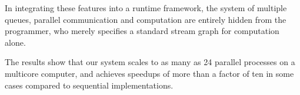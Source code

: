 \documentclass[10pt, conference, compsocconf, reqno]{IEEEtran}
\newcommand{\comment}[1]{}
\begin{document}
In integrating these features into a runtime framework, the system of multiple queues, parallel communication and computation are entirely hidden from the programmer, who merely specifies a standard stream graph for computation alone. \comment{This frees up the programmer from the onerous task of having to decide how their application should be distributed, leaving it instead to the execution engine of our framework, which also looks after the ensuing communication requirements after application distribution.}

The results show that our system scales to as many as 24 parallel processes on a multicore computer, and achieves speedups of more than a factor of ten in some cases compared to sequential implementations.

%
%



%
%
\end{document}
